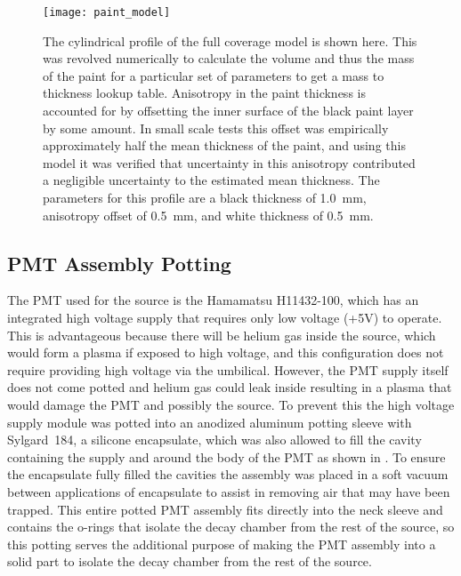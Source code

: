 \begin{figure}
\centering
\texttt{[image: paint\_model]}
\caption{The cylindrical profile of the full coverage model is shown here. This was revolved numerically to calculate the volume and thus the mass of the paint for a particular set of parameters to get a mass to thickness lookup table. Anisotropy in the paint thickness is accounted for by offsetting the inner surface of the black paint layer by some amount. In small scale tests this offset was empirically approximately half the mean thickness of the paint, and using this model it was verified that uncertainty in this anisotropy contributed a negligible uncertainty to the estimated mean thickness. The parameters for this profile are a black thickness of 1.0~mm, anisotropy offset of 0.5~mm, and white thickness of 0.5~mm. }
\label{fig:surfacemodel}
\end{figure}

\subsection{PMT Assembly Potting}
The PMT used for the source is the Hamamatsu H11432-100, which has an integrated high voltage supply that requires only low voltage (+5V) to operate. This is advantageous because there will be helium gas inside the source, which would form a plasma if exposed to high voltage, and this configuration does not require providing high voltage via the umbilical. However, the PMT supply itself does not come potted and helium gas could leak inside resulting in a plasma that would damage the PMT and possibly the source. To prevent this the high voltage supply module was potted into an anodized aluminum potting sleeve with Sylgard~184, a silicone encapsulate, which was also allowed to fill the cavity containing the supply and around the body of the PMT as shown in . To ensure the encapsulate fully filled the cavities the assembly was placed in a soft vacuum between applications of encapsulate to assist in removing air that may have been trapped. This entire potted PMT assembly fits directly into the neck sleeve and contains the o-rings that isolate the decay chamber from the rest of the source, so this potting serves the additional purpose of making the PMT assembly into a solid part to isolate the decay chamber from the rest of the source. 

